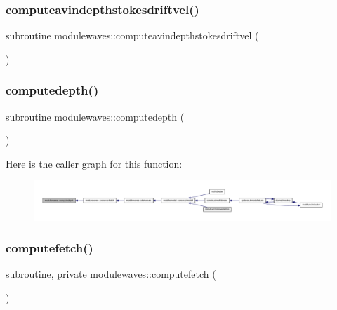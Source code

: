 \mbox{\label{namespacemodulewaves_ad23198cd88a84595114e626504892d21}} 
\subsubsection{\texorpdfstring{computeavindepthstokesdriftvel()}{computeavindepthstokesdriftvel()}}
{\footnotesize\ttfamily subroutine modulewaves\+::computeavindepthstokesdriftvel (\begin{DoxyParamCaption}{ }\end{DoxyParamCaption})\hspace{0.3cm}{\ttfamily [private]}}

\mbox{\label{namespacemodulewaves_a27cdbb0680c11412da65be9051fe9100}} 
\subsubsection{\texorpdfstring{computedepth()}{computedepth()}}
{\footnotesize\ttfamily subroutine modulewaves\+::computedepth (\begin{DoxyParamCaption}{ }\end{DoxyParamCaption})\hspace{0.3cm}{\ttfamily [private]}}

Here is the caller graph for this function\+:\nopagebreak
\begin{figure}[H]
\begin{center}
\leavevmode
\includegraphics[width=350pt]{namespacemodulewaves_a27cdbb0680c11412da65be9051fe9100_icgraph}
\end{center}
\end{figure}
\mbox{\label{namespacemodulewaves_a1ef67144876afbf33cc3bff9a3c88ebd}} 
\subsubsection{\texorpdfstring{computefetch()}{computefetch()}}
{\footnotesize\ttfamily subroutine, private modulewaves\+::computefetch (\begin{DoxyParamCaption}{ }\end{DoxyParamCaption})\hspace{0.3cm}{\ttfamily [private]}}

